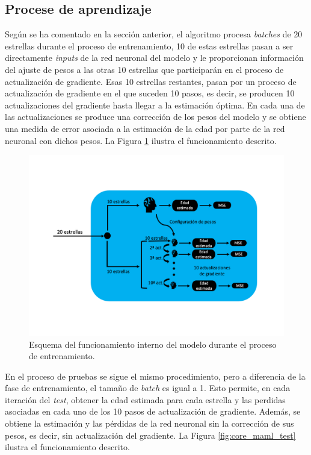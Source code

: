 \subsection{Procese de aprendizaje} 

Según se ha comentado en la sección anterior, el algoritmo procesa \emph{batches} de 20 estrellas durante el proceso de entrenamiento, 10 de estas estrellas pasan a ser directamente \emph{inputs} de la red neuronal del modelo y le proporcionan información del ajuste de pesos a las otras 10 estrellas que participarán en el proceso de actualización de gradiente. Esas 10 estrellas restantes, pasan por un proceso de actualización de gradiente en el que suceden 10 pasos, es decir, se producen 10 actualizaciones del gradiente hasta llegar a la estimación óptima. En cada una de las actualizaciones se produce una corrección de los pesos del modelo y se obtiene una medida de error asociada a la estimación de la edad por parte de la red neuronal con dichos pesos. La Figura \ref{fig:core_maml_train} ilustra el funcionamiento descrito.

\begin{figure}[H]
\begin{center}
 \includegraphics[width=0.8\linewidth]{Figuras/MAML/maml_core_train.pdf}
\end{center}
\caption{Esquema del funcionamiento interno del modelo durante el proceso de entrenamiento.}
 \label{fig:core_maml_train}
\end{figure}

En el proceso de pruebas se sigue el mismo procedimiento, pero a diferencia de la fase de entrenamiento, el tamaño de \emph{batch} es igual a 1. Esto permite, en cada iteración del \emph{test}, obtener la edad estimada para cada estrella y las perdidas asociadas en cada uno de los 10 pasos de actualización de gradiente. Además, se obtiene la estimación y las pérdidas de la red neuronal sin la corrección de sus pesos, es decir, sin actualización del gradiente. La Figura \ref{fig:core_maml_test} ilustra el funcionamiento descrito.

